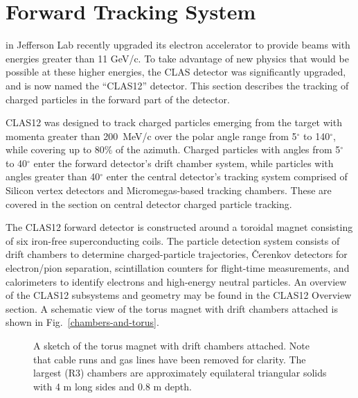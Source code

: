 \section{Forward Tracking System}
\label{overview}

 in
Jefferson Lab recently upgraded its electron accelerator to provide beams with 
energies greater than 11 GeV/c.  To take advantage of new physics that would 
be possible at these higher energies, the CLAS detector was significantly
upgraded, and is now named the ``CLAS12'' detector.  This section describes
the tracking of charged particles in the forward part of the detector.

CLAS12 was designed to track charged particles emerging from the target with
momenta greater than 200~MeV/c over the polar angle range from 5$^{\circ}$ to 
140$^{\circ}$, while covering up to 80$\%$ of the azimuth.  Charged particles with 
angles from 5$^{\circ}$ to 40$^{\circ}$ enter the forward detector's drift chamber
system, while particles with angles greater than 40$^{\circ}$ enter the 
central detector's tracking system comprised of Silicon vertex detectors and
Micromegas-based tracking chambers.  These are covered in the section
on central detector charged particle tracking.

The CLAS12 forward detector is constructed around a toroidal magnet consisting of six 
iron-free superconducting coils.  The particle detection system consists of drift 
chambers to determine charged-particle trajectories, {\v C}erenkov detectors 
for electron/pion separation, scintillation counters for flight-time 
measurements, and calorimeters to identify electrons and high-energy neutral 
particles.  An overview of the CLAS12 subsystems and geometry may be found in the 
CLAS12 Overview section.  A schematic view of the torus magnet with drift chambers
attached is shown in Fig.~\ref{chambers-and-torus}.  


\begin{figure}[htpb]
\vspace{6.7cm} 
\caption{\small{A sketch of the torus magnet with drift chambers attached.
Note that cable runs and gas lines have been removed for clarity.  The largest
(R3) chambers are approximately equilateral triangular solids with 4 m long sides
and 0.8 m depth.}}
\label{clasview_3d}
\end{figure}




